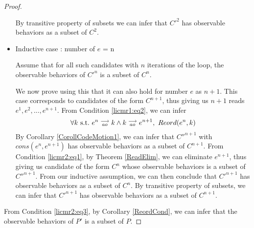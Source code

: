 \begin{proof}
\begin{itemize}
        By transitive property of subsets we can infer that $C'^2$ has observable behaviors as a subset of $C^2$.
        
        \item Inductive case : number of $e$ = n

        Assume that for all such candidates with $n$ iterations of the loop, the observable behaviors of $C'^n$ is a subset of $C^n$.

        We now prove using this that it can also hold for number $e$ as $n + 1$. 
        This case corresponds to candidates of the form $C^{n+1}$, thus giving us $n+1$ reads $e^1, e^2,...,e^{n+1}$.
        From Condition \ref{licmr1:eq2}, we can infer
        \begin{align*}
            \forall k \ \text{s.t.} \ e^n\stackrel{\longrightarrow}{_{ao}}k \wedge k\stackrel{\longrightarrow}{_{ao}}e^{n+1}, \ Reord(e^{n}, k)
        \end{align*}
        By Corollary \ref{CorollCodeMotion1}, we can infer that $C''^{n+1}$ with $cons(e^n, e^{n+1})$ has observable behaviors as a subset of $C^{n+1}$. 
        From Condition \ref{licmr2:eq1}, by Theorem \ref{ReadElim}, we can eliminate $e^{n+1}$, thus giving us candidate of the form $C^n$ whose observable behaviors is a subset of $C''^{n+1}$.
        From our inductive assumption, we can then conclude that $C'^{n+1}$ has observable behaviors as a subset of $C^n$. 
        By transitive property of subsets, we can infer that $C'^{n+1}$ has observable behaviors as a subset of $C^{n+1}$.


    \end{itemize}

    From Condition \ref{licmr2:eq3}, by Corollary \ref{ReordCond}, we can infer that the observable behaviors of $P'$ is a subset of $P$.
    
\end{proof}